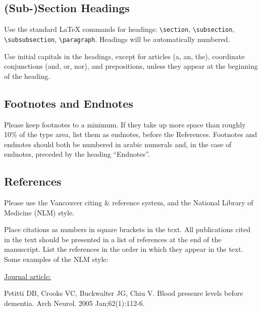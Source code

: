 \documentclass{IOS-Book-Article}
\begin{document}
\subsection{(Sub-)Section Headings}
Use the standard \LaTeX{} commands for headings: {\small \verb|\section|, \verb|\subsection|, \verb|\subsubsection|, \verb|\paragraph|}.
Headings will be automatically numbered.

Use initial capitals in the headings, except for articles (a, an, the), coordinate
conjunctions (and, or, nor), and prepositions, unless they appear at the beginning
of the heading.

\subsection{Footnotes and Endnotes}
Please keep footnotes to a minimum. If they take up more space than roughly 10\% of
the type area, list them as endnotes, before the References. Footnotes and endnotes
should both be numbered in arabic numerals and, in the case of endnotes, preceded by
the heading ``Endnotes''.

\subsection{References}

Please use the Vancouver citing \& reference system, and the National Library of 
Medicine (NLM) style.

Place citations as numbers in square brackets in the text. All publications cited in 
the text should be presented in a list of references at the end of the manuscript. 
List the references in the order in which they appear in the text. Some examples of 
the NLM style:

\medskip
\noindent\ul{Journal article:}\par\noindent
Petitti DB, Crooks VC, Buckwalter JG, Chiu V. Blood pressure levels before dementia. 
Arch Neurol. 2005 Jan;62(1):112-6.
\end{document}
